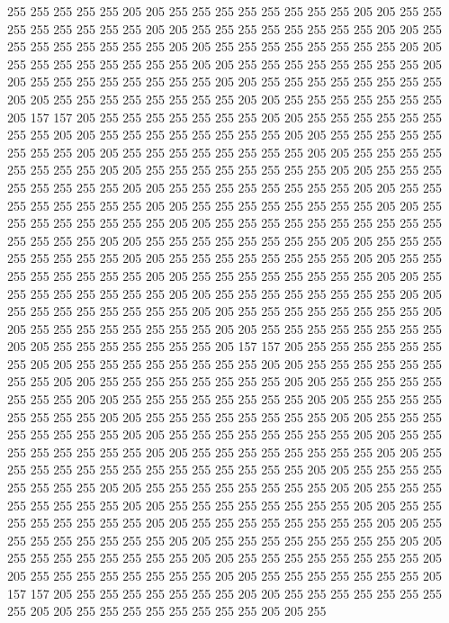 255 255 255 255 255 205 205 255 255 255 255 255 255 255 255 205 205 255 255 255
255 255 255 255 255 205 205 255 255 255 255 255 255 255 255 205 205 255 255 255
255 255 255 255 255 205 205 255 255 255 255 255 255 255 255 205 205 255 255 255
255 255 255 255 255 205 205 255 255 255 255 255 255 255 255 205 205 255 255 255
255 255 255 255 255 205 205 255 255 255 255 255 255 255 255 205 205 255 255 255
255 255 255 255 255 205 205 255 255 255 255 255 255 255 205 157 157 205 255 255
255 255 255 255 255 205 205 255 255 255 255 255 255 255 255 205 205 255 255 255
255 255 255 255 255 205 205 255 255 255 255 255 255 255 255 205 205 255 255 255
255 255 255 255 255 205 205 255 255 255 255 255 255 255 255 205 205 255 255 255
255 255 255 255 255 205 205 255 255 255 255 255 255 255 255 205 205 255 255 255
255 255 255 255 255 205 205 255 255 255 255 255 255 255 255 205 205 255 255 255
255 255 255 255 255 205 205 255 255 255 255 255 255 255 255 205 205 255 255 255
255 255 255 255 255 255 255 255 255 255 255 205 205 255 255 255 255 255 255 255
255 205 205 255 255 255 255 255 255 255 255 205 205 255 255 255 255 255 255 255
255 205 205 255 255 255 255 255 255 255 255 205 205 255 255 255 255 255 255 255
255 205 205 255 255 255 255 255 255 255 255 205 205 255 255 255 255 255 255 255
255 205 205 255 255 255 255 255 255 255 255 205 205 255 255 255 255 255 255 255
255 205 205 255 255 255 255 255 255 255 255 205 205 255 255 255 255 255 255 255
255 205 205 255 255 255 255 255 255 255 205 157 157 205 255 255 255 255 255 255
255 205 205 255 255 255 255 255 255 255 255 205 205 255 255 255 255 255 255 255
255 205 205 255 255 255 255 255 255 255 255 205 205 255 255 255 255 255 255 255
255 205 205 255 255 255 255 255 255 255 255 205 205 255 255 255 255 255 255 255
255 205 205 255 255 255 255 255 255 255 255 205 205 255 255 255 255 255 255 255
255 205 205 255 255 255 255 255 255 255 255 205 205 255 255 255 255 255 255 255
255 205 205 255 255 255 255 255 255 255 255 205 205 255 255 255 255 255 255 255
255 255 255 255 255 255 255 205 205 255 255 255 255 255 255 255 255 205 205 255
255 255 255 255 255 255 255 205 205 255 255 255 255 255 255 255 255 205 205 255
255 255 255 255 255 255 255 205 205 255 255 255 255 255 255 255 255 205 205 255
255 255 255 255 255 255 255 205 205 255 255 255 255 255 255 255 255 205 205 255
255 255 255 255 255 255 255 205 205 255 255 255 255 255 255 255 255 205 205 255
255 255 255 255 255 255 255 205 205 255 255 255 255 255 255 255 255 205 205 255
255 255 255 255 255 255 205 157 157 205 255 255 255 255 255 255 255 205 205 255
255 255 255 255 255 255 255 205 205 255 255 255 255 255 255 255 255 205 205 255
